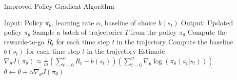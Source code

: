 \documentclass{article} %
\theoremstyle{definition}
\begin{document}
\begin{algorithm}[H]
    \caption{Improved Policy Gradient Algorithm}
    \label{alg:reinforce}
    \begin{algorithmic}[1]
        \State Input: Policy $\pi_\theta$, learning rate $\alpha$, baseline of choice $b(s_t)$
        \State Output: Updated policy $\pi_\theta$
            \State Sample a batch of trajectories $T$ from the policy $\pi_\theta$
                \State Compute the rewards-to-go $R_t$ for each time step $t$ in the trajectory
                \State Compute the baseline $b(s_t)$ for each time step $t$ in the trajectory
                \State Estimate $\nabla_\theta J(\pi_\theta) \approx \frac{1}{m} \left(\sum_{t = 0}^{n} R_t - b(s_t)\right) \left( \sum_{t=0}^{n} \nabla_\theta \log(\pi_\theta(a_t | s_t)) \right)$
            \EndFor
            \State $\theta \leftarrow \theta + \alpha \nabla_\theta J(\pi_\theta)$
        \EndWhile
    \end{algorithmic}
\end{algorithm}
\end{document}
